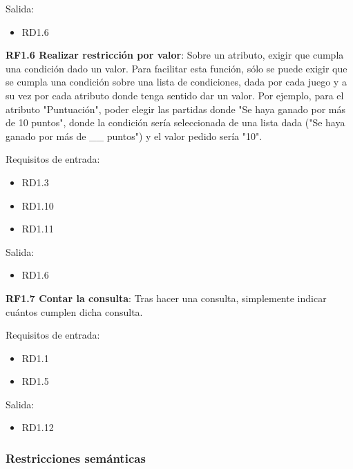 	Salida:
	\begin{itemize}
		\item RD1.6
	\end{itemize}
	
	
	\item \textbf{RF1.6 Realizar restricción por valor}: Sobre un atributo, exigir que cumpla una condición dado un valor. Para facilitar esta función, sólo se puede exigir que se cumpla una condición sobre una lista de condiciones, dada por cada juego y a su vez por cada atributo donde tenga sentido dar un valor. Por ejemplo, para el atributo "Puntuación", poder elegir las partidas donde "Se haya ganado por más de 10 puntos", donde la condición sería seleccionada de una lista dada ("Se haya ganado por más de \_\_ puntos") y el valor pedido sería "10".
	
	Requisitos de entrada:
	\begin{itemize}
		\item RD1.3
		\item RD1.10
		\item RD1.11
	\end{itemize}
	Salida:
	\begin{itemize}
		\item RD1.6
	\end{itemize}
	
	
	\item \textbf{RF1.7 Contar la consulta}: Tras hacer una consulta, simplemente indicar cuántos cumplen dicha consulta.
	
	Requisitos de entrada:
	\begin{itemize}
		\item RD1.1
		\item RD1.5
	\end{itemize}
	Salida:
	\begin{itemize}
		\item RD1.12
	\end{itemize}

\subsubsection{Restricciones semánticas}